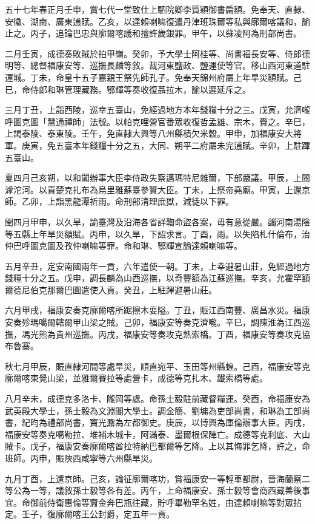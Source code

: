 \begin{pinyinscope}
五十七年春正月壬申，賞七代一堂致仕上駟院卿李質穎御書扁額。免奉天、直隸、安徽、湖南、廣東逋賦。乙亥，以達賴喇嘛復遣丹津班珠爾等私與廓爾喀議和，諭止之。丙子，追論巴忠與廓爾喀議和擅許歲銀罪。甲午，以蘇凌阿為刑部尚書。

二月壬寅，成德奏敗賊於拍甲嶺。癸卯，予大學士阿桂等、尚書福長安等、侍郎德明等、總督福康安等、巡撫長麟等敘。裁河東鹽政、鹽運使等官。移山西河東道駐運城。丁未，命皇十五子嘉親王祭先師孔子。免奉天錦州府屬上年旱災額賦。己巳，命侍郎和琳管理藏務。鄂輝等奏收復聶拉木，諭以遲延斥之。

三月丁丑，上詣西陵，巡幸五臺山，免經過地方本年錢糧十分之三。戊寅，允濟嚨呼圖克圖「慧通禪師」法號。以帕克哩營官番眾收復哲孟雄、宗木，賚之。辛巳，上謁泰陵、泰東陵。壬午，免直隸大興等八州縣積欠米穀。甲申，加福康安大將軍。庚寅，免五臺本年錢糧十分之五，大同、朔平二府屬未完逋賦。辛卯，上駐蹕五臺山。

夏四月己亥朔，以和闐辦事大臣李侍政失察邁瑪特尼雜爾，下部嚴議。甲辰，上閱滹沱河。以貢楚克扎布為烏里雅蘇臺參贊大臣。丁未，上祭帝堯廟。甲寅，上還京師。乙卯，上詣黑龍潭祈雨。命刑部清理庶獄，減徒以下罪。

閏四月甲申，以久旱，諭臺灣及沿海各省詳鞫命盜各案，毋有意從嚴。蠲河南湯陰等五縣上年旱災額賦。丙申，以久旱，下詔求言。丁酉，雨。以失陷札什倫布，治仲巴呼圖克圖及孜仲喇嘛等罪。命和琳、鄂輝宣諭達賴喇嘛等。

五月辛丑，定安南國兩年一貢，六年遣使一朝。丁未，上幸避暑山莊，免經過地方錢糧十分之五。戊申，調長麟為山西巡撫，以奇豐額為江蘇巡撫。辛亥，允霍罕額爾德尼伯克那爾巴圖遣使入貢。癸丑，上駐蹕避暑山莊。

六月甲戌，福康安奏克廓爾喀所踞擦木耍隘。丁丑，賑江西南豐、廣昌水災。福康安奏殄瑪噶爾轄爾甲山梁之賊。己卯，福康安等奏克濟嚨。辛巳，調陳淮為江西巡撫，馮光熊為貴州巡撫。丙戌，福康安等奏攻克熱索橋。丁酉，福康安等奏攻克協布魯寨。

秋七月甲辰，賑直隸河間等處旱災，順直宛平、玉田等州縣蝗。己酉，福康安等克廓爾喀東覺山梁，並雅爾賽拉等處營卡，成德等克扎木、鐵索橋等處。

八月辛未，成德克多洛卡、隴岡等處。命孫士毅駐前藏督糧運。癸酉，命福康安為武英殿大學士，孫士毅為文淵閣大學士。調金簡、劉墉為吏部尚書，和琳為工部尚書，紀昀為禮部尚書，竇光鼐為左都御史。庚辰，以博興為庫倫辦事大臣。丙戌，福康安等奏克噶勒拉、堆補木城卡，阿滿泰、墨爾根保陣亡。成德等克利底、大山賊卡。戊子，福康安奏廓爾喀酋拉特納巴都爾等乞降。上以其悔罪乞降，許之，命班師。丙申，賑陜西咸寧等六州縣旱災。

九月丁酉，上還京師。己亥，論征廓爾喀功，賞福康安一等輕車都尉，晉海蘭察二等公為一等，議敘孫士毅等各有差。丙午，上命福康安、孫士毅等會商西藏善後事宜。命御前侍衛惠倫等齎金奔巴瓶往藏，貯呼畢勒罕名姓，由達賴喇嘛等對眾拈定。壬子，復廓爾喀王公封爵，定五年一貢。


\end{pinyinscope}
